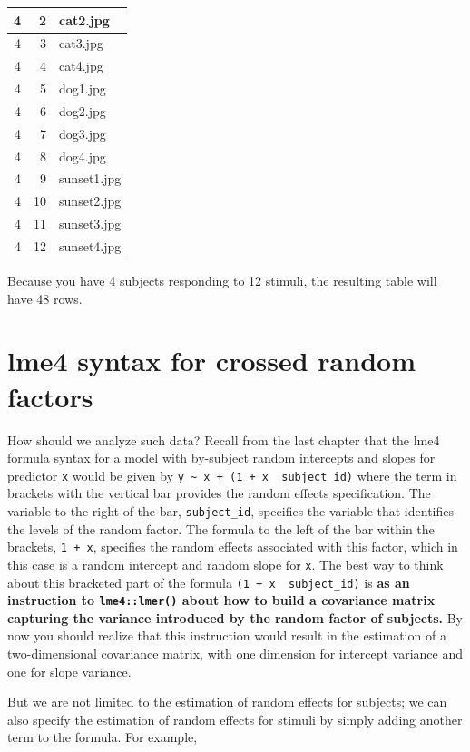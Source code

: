 \documentclass[]{book}
\begin{document}
\begin{tabular}{r|r|l}
\hline
4 & 2 & cat2.jpg\\
\hline
4 & 3 & cat3.jpg\\
\hline
4 & 4 & cat4.jpg\\
\hline
4 & 5 & dog1.jpg\\
\hline
4 & 6 & dog2.jpg\\
\hline
4 & 7 & dog3.jpg\\
\hline
4 & 8 & dog4.jpg\\
\hline
4 & 9 & sunset1.jpg\\
\hline
4 & 10 & sunset2.jpg\\
\hline
4 & 11 & sunset3.jpg\\
\hline
4 & 12 & sunset4.jpg\\
\hline
\end{tabular}

Because you have 4 subjects responding to 12 stimuli, the resulting table will have 48 rows.

\hypertarget{lme4-syntax-for-crossed-random-factors}{%
\section{lme4 syntax for crossed random factors}\label{lme4-syntax-for-crossed-random-factors}}

How should we analyze such data? Recall from the last chapter that the lme4 formula syntax for a model with by-subject random intercepts and slopes for predictor \texttt{x} would be given by \texttt{y\ \textasciitilde{}\ x\ +\ (1\ +\ x\ \textbar{}\ subject\_id)} where the term in brackets with the vertical bar \texttt{\textbar{}} provides the random effects specification. The variable to the right of the bar, \texttt{subject\_id}, specifies the variable that identifies the levels of the random factor. The formula to the left of the bar within the brackets, \texttt{1\ +\ x}, specifies the random effects associated with this factor, which in this case is a random intercept and random slope for \texttt{x}. The best way to think about this bracketed part of the formula \texttt{(1\ +\ x\ \textbar{}\ subject\_id)} is \textbf{as an instruction to \texttt{lme4::lmer()} about how to build a covariance matrix capturing the variance introduced by the random factor of subjects.} By now you should realize that this instruction would result in the estimation of a two-dimensional covariance matrix, with one dimension for intercept variance and one for slope variance.

But we are not limited to the estimation of random effects for subjects; we can also specify the estimation of random effects for stimuli by simply adding another term to the formula. For example,
\end{document}
